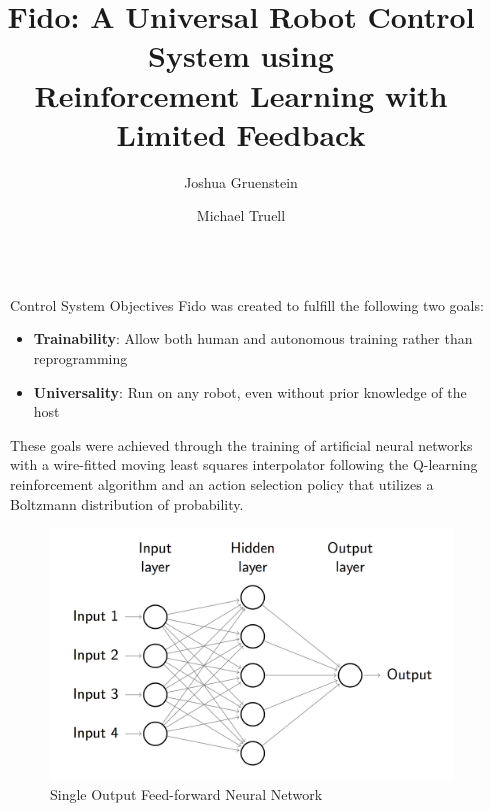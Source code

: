 \documentclass[final]{beamer}
\title{Fido: A Universal Robot Control System using\\Reinforcement Learning with Limited Feedback}
\author{Joshua Gruenstein \and Michael Truell}
\institute{Horace Mann School}
\newlength{\sepwid}
\newlength{\onecolwid}
\begin{document}
\setlength{\belowcaptionskip}{2ex}
\setlength\belowdisplayshortskip{2ex}

\begin{frame}[t]
\begin{columns}[t]

\begin{column}{\sepwid}\end{column}

\begin{column}{\onecolwid}


	\begin{alertblock}{Control System Objectives}
		Fido was created to fulfill the following two goals:
		\begin{itemize}
			\item \textbf{Trainability}: Allow both human and autonomous training rather than reprogramming
			\item \textbf{Universality}: Run on any robot, even without prior knowledge of the host
		\end{itemize}
		These goals were achieved through the training of artificial neural networks with a wire-fitted moving least squares interpolator following the Q-learning reinforcement algorithm and an action selection policy that utilizes a Boltzmann distribution of probability.
	\end{alertblock}


\begin{figure}
	\centering
	\includegraphics[width=\linewidth]{Figures/FeedForwardRendered}
	\caption{Single Output Feed-forward Neural Network}
	\label{fig:feedforward}
\end{figure}


\end{column}
\end{columns}
\end{frame}
\end{document}
